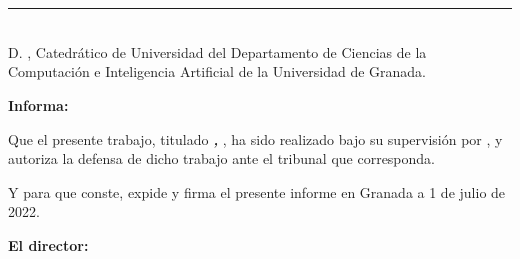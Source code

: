 \chapter*{}

\thispagestyle{empty}

\noindent\rule[-1ex]{\textwidth}{2pt}\\[4.5ex]

D. \textbf{\myProf}, Catedrático de Universidad del Departamento de Ciencias de la Computación e Inteligencia Artificial de la Universidad de Granada.

    \vspace{0.5cm}

\textbf{Informa:}

    \vspace{0.5cm}

Que el presente trabajo, titulado \textit{\textbf{\myTitleShort, \myTitle}}, ha sido realizado bajo su supervisión por \textbf{\myName}, y autoriza la defensa de dicho trabajo ante el tribunal que corresponda.

    \vspace{0.5cm}

Y para que conste, expide y firma el presente informe en Granada a 1 de julio de 2022.

    \vspace{1cm}

\textbf{El director:}

    \vspace{5cm}

\noindent \textbf{\myProf}

